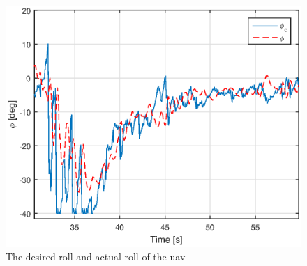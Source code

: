\begin{figure}[H]
\centering
\includegraphics[scale=0.7]{figs/Experiment/rollDesired131844.eps}
\caption{The desired roll and actual roll of the \gls{uav}}
\label{Fig:DesiredRoll131844}
\end{figure}
